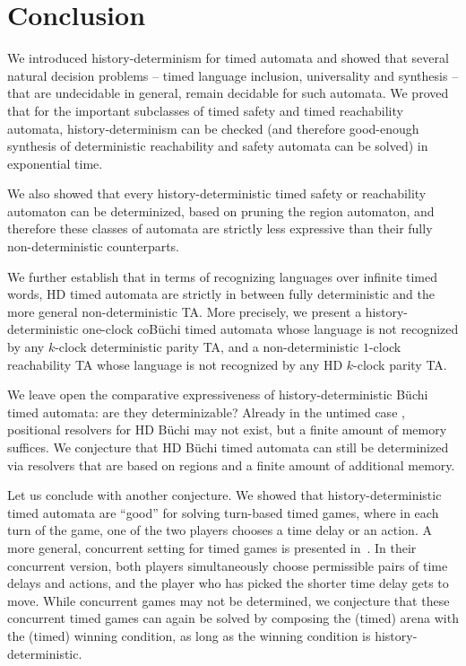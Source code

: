 \documentclass[10pt,a4paper]{amsart}
\theoremstyle{definition}
\numberwithin{equation}{section}
\begin{document}
	
	
	\section{Conclusion}
	\label{sec_conclusion}
We introduced history-determinism for timed automata and showed that several natural decision problems
-- timed language inclusion, universality and synthesis --
that are undecidable in general,
remain decidable for such automata.
We proved that for the important subclasses of timed safety and timed reachability automata, history-determinism can be checked (and therefore good-enough synthesis of deterministic reachability and safety automata can be solved) in exponential time.

We also showed that every history-deterministic timed safety or reachability automaton can be determinized, based on pruning the region automaton, and therefore these classes of automata are strictly less expressive than their fully non-deterministic counterparts.

We further establish that in terms of recognizing languages over infinite timed words, HD timed automata are strictly in between fully deterministic and the more general non-deterministic TA. More precisely, we present a history-deterministic one-clock coB\"uchi timed automata whose language is not recognized by any $k$-clock deterministic parity TA,
and a non-deterministic $1$-clock reachability TA whose language is not recognized by any HD $k$-clock parity TA.

We leave open the comparative expressiveness of history-deterministic B\"uchi timed automata:
are they determinizable? Already in the untimed case \cite{RK19},
positional resolvers for HD B\"uchi may not exist, but a finite amount of memory suffices.
We conjecture that HD B\"uchi timed automata can still be determinized via resolvers that
are based on regions and a finite amount of additional memory.

Let us conclude with another conjecture.
We showed that history-deterministic timed automata are ``good'' for solving
turn-based timed games, where in each turn of the game, one of the two players
chooses a time delay or an action. 
A more general, concurrent setting for timed games is presented in~\cite{DFHM03}.
In their concurrent version, both players simultaneously choose permissible pairs
of time delays and actions, and the player who has picked the shorter time delay
gets to move.
While concurrent games may not be determined, we conjecture that these concurrent
timed games can again be solved by composing the (timed) arena with the (timed)
winning condition, as long as the winning condition is history-deterministic.
\end{document}
